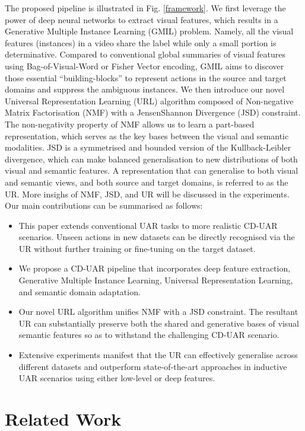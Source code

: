 \documentclass[10pt,twocolumn,letterpaper]{article}
\begin{document}
The proposed pipeline is illustrated in Fig. \ref{framework}. We first leverage the power of deep neural networks to extract visual features, which results in a Generative Multiple Instance Learning (GMIL) problem. Namely, all the visual features (instances) in a video share the label while only a small portion is determinative. Compared to conventional global summaries of visual features using Bag-of-Visual-Word or Fisher Vector encoding, GMIL aims to discover those essential ``building-blocks'' to represent actions in the source and target domains and suppress the ambiguous instances. We then introduce our novel Universal Representation Learning (URL) algorithm composed of Non-negative Matrix Factorisation (NMF) with a JensenShannon Divergence (JSD) constraint. The non-negativity property of NMF allows us to learn a part-based representation, which serves as the key bases between the visual and semantic modalities. JSD is a symmetrised and bounded version of the Kullback-Leibler divergence, which can make balanced generalisation to new distributions of both visual and semantic features. A representation that can generalise to both visual and semantic views, and both source and target domains, is referred to as the UR. More insighs of NMF, JSD, and UR will be discussed in the experiments. Our main contributions can be summarised as follows:
\begin{itemize}
	\item This paper extends conventional UAR tasks to more realistic CD-UAR scenarios. Unseen actions in new datasets can be directly recognised via the UR without further training or fine-tuning on the target dataset.
	\item We propose a CD-UAR pipeline that incorporates deep feature extraction, Generative Multiple Instance Learning, Universal Representation Learning, and semantic domain adaptation.
	\item Our novel URL algorithm unifies NMF with a JSD constraint. The resultant UR can substantially preserve both the shared and generative bases of visual semantic features so as to withstand the challenging CD-UAR scenario.
	\item Extensive experiments manifest that the UR can effectively generalise across different datasets and outperform state-of-the-art approaches in inductive UAR scenarios using either low-level or deep features.
\end{itemize}

\section{Related Work}
\end{document}
